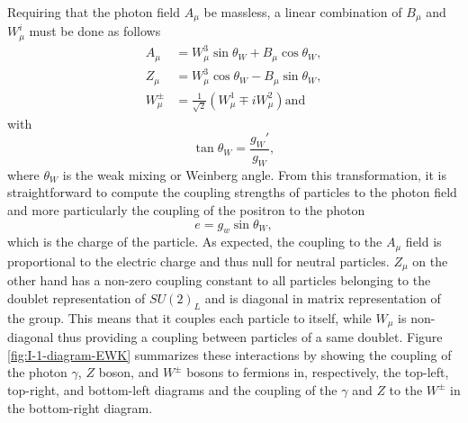     Requiring that the photon field $ A_\mu $ be massless, a linear combination of $ B_\mu $ and $ W^i_\mu $ must be done as follows
    \begin{align}
      A_\mu & = W^3_\mu \sin \theta_W + B_\mu \cos \theta_W , \\
      Z_\mu & = W^3_\mu \cos \theta_W - B_\mu \sin \theta_W , \\
      W^\pm_\mu & = \frac{1}{\sqrt{2}} \left( W^1_\mu \mp i W^2_\mu \right) \text{and}
    \end{align}
    with
    \begin{equation}
      \tan \theta_W = \frac{g_W'}{g_W} ,
    \end{equation}
    where $ \theta_W $ is the weak mixing or Weinberg angle. From this transformation, it is straightforward to compute the coupling strengths of particles to the photon field and more particularly the coupling of the positron to the photon
    \begin{equation}
      e = g_w \sin \theta_W ,
    \end{equation}
    which is the charge of the particle. As expected, the coupling to the $ A_\mu $ field is proportional to the electric charge and thus null for neutral particles. $ Z_\mu $ on the other hand has a non-zero coupling constant to all particles belonging to the doublet representation of $ SU(2)_L $ and is diagonal in matrix representation of the group. This means that it couples each particle to itself, while $ W_\mu $ is non-diagonal thus providing a coupling between particles of a same doublet. Figure \ref{fig:I-1-diagram-EWK} summarizes these interactions by showing the coupling of the photon $ \gamma $, $ Z $ boson, and $ W^\pm $ bosons to fermions in, respectively, the top-left, top-right, and bottom-left diagrams and the coupling of the $ \gamma $ and $ Z $ to the $ W^\pm $ in the bottom-right diagram.

